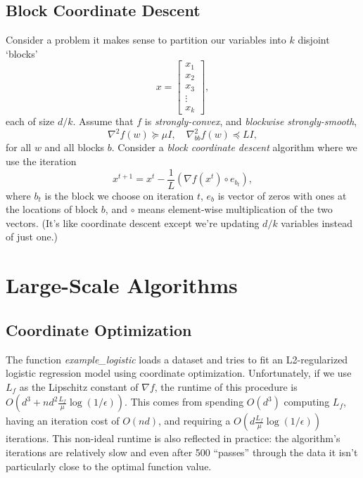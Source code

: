 \documentclass{article}
\begin{document}
\subsection{Block Coordinate Descent}

Consider a problem it makes sense to partition our variables into $k$ disjoint `blocks'
\[
x = \begin{bmatrix}x_1\\x_2\\x_3\\\vdots\\x_k\end{bmatrix},
\]
each of size $d/k$. Assume that $f$ is \emph{strongly-convex}, and \emph{blockwise strongly-smooth},
\[
\nabla^2 f(w) \succeq \mu I, \quad \nabla_{bb}^2 f(w) \preceq LI,
\]
for all $w$ and all blocks $b$.
Consider a \emph{block coordinate descent} algorithm where we use the iteration
\[
x^{t+1} = x^t - \frac{1}{L}(\nabla f(x^t)\circ e_{b_t}),
\]
where $b_t$ is the block we choose on iteration $t$, $e_b$ is vector of zeros with ones at the locations of block $b$, and $\circ$ means element-wise multiplication of the two vectors. (It's like coordinate descent except we're updating $d/k$ variables instead of just one.)



\section{Large-Scale Algorithms}

\subsection{Coordinate Optimization}

The function \emph{example\_logistic} loads a dataset and tries to fit an L2-regularized logistic regression model using coordinate optimization. Unfortunately, if we use $L_f$ as the Lipschitz constant of $\nabla f$, the runtime of this procedure is $O(d^3 + nd^2\frac{L_f}{\mu}\log(1/\epsilon))$. This comes from spending $O(d^3)$ computing $L_f$, having an iteration cost of $O(nd)$, and requiring a $O(d\frac{L_f}{\mu}\log(1/\epsilon))$ iterations. This non-ideal runtime is also reflected in practice: the algorithm's iterations are relatively slow and even after 500 ``passes'' through the data it isn't particularly close to the optimal function value.
\end{document}
